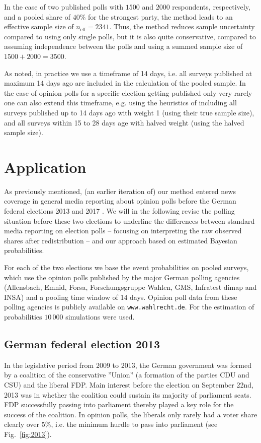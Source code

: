 \documentclass[smallcondensed]{svjour3}     %
\begin{document}
In the case of two published polls with $1500$ and $2000$ respondents, respectively, and a pooled share of $40\%$
for the strongest party, the method leads
to an effective sample size of $n_{\text{eff}} = 2341$. Thus, the method reduces sample uncertainty
compared to using only single polls, but it is also quite conservative, compared to
assuming independence between the polls and using a summed sample size of $1500 + 2000 = 3500$.

As noted, in practice we use a timeframe of 14 days, i.e. all surveys published at maximum 14 days ago are included
in the calculation of the pooled sample. In the case of opinion polls for a specific election getting published
only very rarely one can also extend this timeframe, e.g. using the heuristics of including all surveys published up to 14 days
ago with weight 1 (using their true sample size), and all surveys within 15 to 28 days age with halved weight
(using the halved sample size).



\section{Application} \label{sec:application}
As previously mentioned, (an earlier iteration of) our method entered news coverage 
in general media reporting about opinion polls before the German federal elections
2013 and 2017 \citep[cf.][]{wahlistik_2013, gelitz_2017}.
We will in the following revise the polling situation before these two elections
to underline the differences between standard media reporting on election polls
-- focusing on interpreting the raw observed shares after redistribution --
and our approach based on estimated Bayesian probabilities.

For each of the two elections we base the event probabilities on
pooled surveys, which use the opinion polls published by the major
German polling agencies (Allensbach, Emnid, Forsa, Forschungsgruppe Wahlen,
GMS, Infratest dimap and INSA) and a pooling time window of 14 days.
Opinion poll data from these polling agencies is publicly available
on \texttt{www.wahlrecht.de}. For the estimation of probabilities $10\,000$
simulations were used.


\subsection{German federal election 2013} \label{subsec:2013}
In the legislative period from 2009 to 2013, the German government was formed by
a coalition of the conservative ''Union'' (a formation of the parties CDU and CSU)
and the liberal FDP.
Main interest before the election on September 22nd, 2013 was in whether the
coalition could sustain its majority of parliament seats. FDP successfully passing
into parliament thereby played a key role for the success of the coalition.
In opinion polls, the liberals only rarely had a voter share clearly over
$5\%$, i.e. the minimum hurdle to pass into parliament (see Fig.~\ref{fig:2013}).
\end{document}
